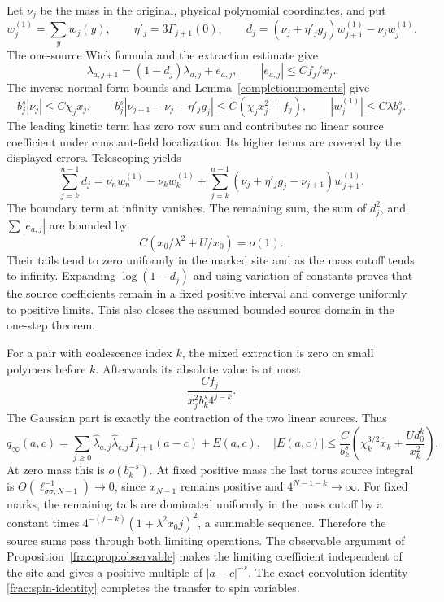 \documentclass[11pt]{article}
\begin{document}
Let \(\nu_j\) be the mass in the original, physical polynomial
coordinates, and put
\[
 w_j^{(1)}=\sum_yw_j(y),\qquad \eta'_j=3\Gamma_{j+1}(0),
 \qquad
 d_j=(\nu_j+\eta'_jg_j)w_{j+1}^{(1)}-\nu_jw_j^{(1)}.
\]
The one-source Wick formula and the extraction estimate give
\[
 \lambda_{a,j+1}=(1-d_j)\lambda_{a,j}+e_{a,j},
 \qquad |e_{a,j}|\le Cf_j/x_j.
\]
The inverse normal-form bounds and Lemma~\ref{completion:moments}
give
\[
 b_j^s|\nu_j|\le C\chi_jx_j,
 \qquad
 b_j^s|\nu_{j+1}-\nu_j-\eta'_jg_j|
          \le C(\chi_jx_j^2+f_j),\qquad
 |w_j^{(1)}|\le C\lambda b_j^s.
\]
The leading kinetic term has zero row sum and contributes no linear
source coefficient under constant-field localization. Its higher
terms are covered by the displayed errors.
Telescoping yields
\[
 \sum_{j=k}^{n-1}d_j
 =\nu_nw_n^{(1)}-\nu_kw_k^{(1)}
 +\sum_{j=k}^{n-1}(\nu_j+\eta'_jg_j-\nu_{j+1})w_{j+1}^{(1)}.
\]
The boundary term at infinity vanishes. The remaining sum, the sum
of \(d_j^2\), and \(\sum|e_{a,j}|\) are bounded by
\[
 C\left(x_0/\lambda^2+U/x_0\right)=o(1).
\]
Their tails tend to zero uniformly in the marked site and as the
mass cutoff tends to infinity. Expanding \(\log(1-d_j)\) and using
variation of constants proves that the source coefficients remain
in a fixed positive interval and converge uniformly to positive
limits. This also closes the assumed bounded source domain in the
one-step theorem.

For a pair with coalescence index \(k\), the mixed extraction is zero
on small polymers before \(k\). Afterwards its absolute value is at
most
\[
 \frac{Cf_j}{x_j^2 b_k^s4^{j-k}}.
\]
The Gaussian part is exactly the contraction of the two linear
sources. Thus
\[
 q_\infty(a,c)=\sum_{j\ge0}\widehat\lambda_{a,j}
                 \widehat\lambda_{c,j}\Gamma_{j+1}(a-c)+E(a,c),
 \quad
 |E(a,c)|\le\frac C{b_k^s}
       \left(\chi_k^{3/2}x_k+\frac{Ud_0^k}{x_k^2}\right).
\]
At zero mass this is \(o(b_k^{-s})\). At fixed positive mass the
last torus source integral is
\(O(\ell_{\sigma\sigma,N-1}^{-1})\to0\), since
\(x_{N-1}\) remains positive and \(4^{N-1-k}\to\infty\).
For fixed marks, the remaining tails are dominated uniformly in
the mass cutoff by a constant times
\(4^{-(j-k)}(1+\lambda^2x_0j)^2\), a summable sequence. Therefore
the source sums pass through both limiting operations. The
observable argument of Proposition~\ref{frac:prop:observable} makes
the limiting coefficient independent of the site and gives a
positive multiple of \(|a-c|^{-s}\). The exact convolution identity
\eqref{frac:spin-identity} completes the transfer to spin variables.
\end{document}
